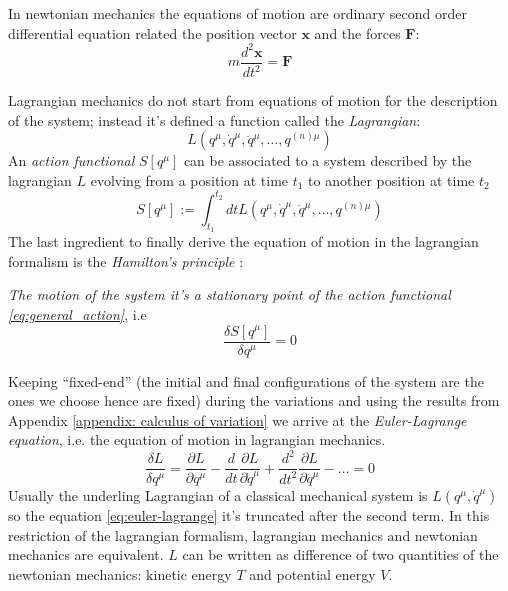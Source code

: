 In newtonian mechanics the equations of motion are ordinary second order differential
equation related the position vector $\bm{x}$ and the forces $\bm{F}$:
\begin{equation*}
    m \frac{d^2\bm{x}}{dt^2} = \bm{F}
\end{equation*}

Lagrangian mechanics do not start from equations of motion for the description of the
system; instead it's defined a function called the \emph{Lagrangian}:
\begin{equation} \label{eq:general_lagrangian}
    L(q^{\mu}, \dot{q}^{\mu}, \ddot{q}^{\mu}, \ldots, q^{(n)\mu})
\end{equation}
An \emph{action functional} $S[q^{\mu}]$ can be associated to a system described by the
lagrangian $L$ evolving from a position at time $t_1$ to another position at time $t_2$
\begin{equation} \label{eq:general_action}
    S[q^{\mu}] := \int_{t_1}^{t_2} dt L(q^{\mu}, \dot{q}^{\mu}, \ddot{q}^{\mu}, \ldots, q^{(n)\mu})
\end{equation}
The last ingredient to finally derive the equation of motion in the lagrangian formalism
is the \emph{Hamilton's principle} \cite{Goldstein11_Ham_principle}:
\begin{displayquote}
    \emph{The motion of the system it's a stationary point of the action functional
    \eqref{eq:general_action}}, i.e
    \begin{equation*}
        \frac{\delta S[q^{\mu}]}{\delta q^{\mu}} = 0
    \end{equation*}
\end{displayquote}
Keeping ``fixed-end'' (the initial and final configurations of the system are the ones
we choose hence are fixed) during the variations and using the results from Appendix
\ref{appendix: calculus of variation} we arrive at the \emph{Euler-Lagrange equation},
i.e. the equation of motion in lagrangian mechanics.
\begin{equation} \label{eq:euler-lagrange}
    \frac{\delta L}{\delta q^{\mu}} =
    \frac{\partial L}{\partial q^{\mu}} -
    \frac{d}{dt}\frac{\partial L}{\partial \dot{q}^{\mu}} +
    \frac{d^2}{dt^2}\frac{\partial L}{\partial \ddot{q}^{\mu}} -
    \ldots = 0
\end{equation}
Usually the underling Lagrangian of a classical mechanical system is $L(q^{\mu},
\dot{q}^{\mu})$ so the equation \eqref{eq:euler-lagrange} it's truncated after the
second term. In this restriction of the lagrangian formalism, lagrangian mechanics and
newtonian mechanics are equivalent. $L$ can be written as difference of two
quantities of the newtonian mechanics: kinetic energy $T$ and potential energy $V$.
